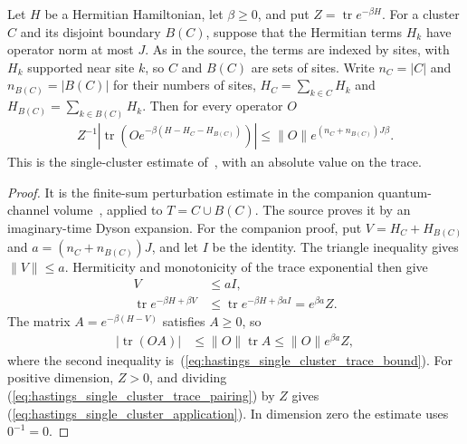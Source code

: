 \begin{lemma}
    \label{thm:hastings_single_cluster_bound}
    Let $H$ be a Hermitian Hamiltonian, let $\beta\ge0$, and put
    $Z=\operatorname{tr}e^{-\beta H}$. For a cluster $C$ and its disjoint boundary
    $B(C)$, suppose that the Hermitian terms $H_k$ have operator norm at most $J$.
    As in the source, the terms are indexed by sites, with $H_k$ supported near
    site $k$, so $C$ and $B(C)$ are sets of sites. Write $n_C=|C|$ and
    $n_{B(C)}=|B(C)|$ for their numbers of sites, $H_C=\sum_{k\in C}H_k$ and
    $H_{B(C)}=\sum_{k\in B(C)}H_k$. Then for every operator $O$
    \begin{align}
        Z^{-1}\left|\operatorname{tr}\left(Oe^{-\beta(H-H_C-H_{B(C)})}\right)\right|
        \le\|O\|e^{(n_C+n_{B(C)})J\beta}.
        \label{eq:hastings_single_cluster_application}
    \end{align}
    This is the single-cluster estimate of~\cite[Section IV]{Hastings2006Solving},
    with an absolute value on the trace.
\end{lemma}
\begin{proof}
    It is the finite-sum perturbation estimate in the companion quantum-channel
    volume~\cite[``The single-cluster bound'']{QICLean2026Blueprint}, applied to
    $T=C\cup B(C)$. The source proves it by an imaginary-time Dyson expansion. For
    the companion proof, put $V=H_C+H_{B(C)}$ and $a=(n_C+n_{B(C)})J$, and let $I$ be the identity.
    The triangle inequality gives $\|V\|\le a$. Hermiticity and monotonicity of the
    trace exponential then give
    \begin{align}
        V & \le aI,                                                 \\
        \operatorname{tr}e^{-\beta H+\beta V}
          & \le\operatorname{tr}e^{-\beta H+\beta aI}=e^{\beta a}Z.
        \label{eq:hastings_single_cluster_trace_bound}
    \end{align}
    The matrix $A=e^{-\beta(H-V)}$ satisfies $A\ge0$, so
    \begin{align}
        |\operatorname{tr}(OA)|
         & \le\|O\|\operatorname{tr}A
        \le\|O\|e^{\beta a}Z,
        \label{eq:hastings_single_cluster_trace_pairing}
    \end{align}
    where the second inequality is~(\ref{eq:hastings_single_cluster_trace_bound}).
    For positive dimension, $Z>0$, and dividing
    (\ref{eq:hastings_single_cluster_trace_pairing}) by $Z$ gives
    (\ref{eq:hastings_single_cluster_application}). In dimension zero the estimate
    uses $0^{-1}=0$.
\end{proof}

